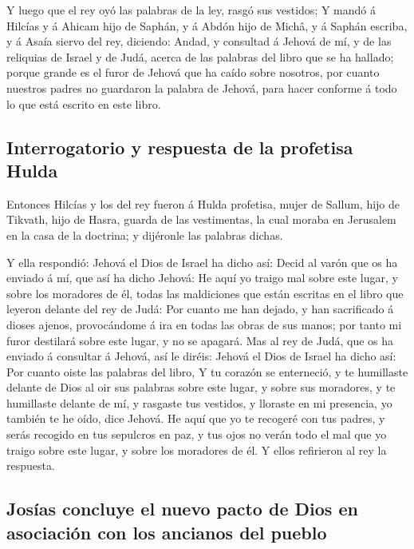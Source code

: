  Y luego que el rey oyó las palabras de la ley, rasgó sus
vestidos;  Y mandó á Hilcías y á Ahicam hijo de Saphán, y á
Abdón hijo de Michâ, y á Saphán escriba, y á Asaía siervo del rey,
diciendo:  Andad, y consultad á Jehová de mí, y de las
reliquias de Israel y de Judá, acerca de las palabras del libro que se
ha hallado; porque grande es el furor de Jehová que ha caído sobre
nosotros, por cuanto nuestros padres no guardaron la palabra de Jehová,
para hacer conforme á todo lo que está escrito en este libro.

\hypertarget{interrogatorio-y-respuesta-de-la-profetisa-hulda}{%
\subsection{Interrogatorio y respuesta de la profetisa
Hulda}\label{interrogatorio-y-respuesta-de-la-profetisa-hulda}}

 Entonces Hilcías y los del rey fueron á Hulda profetisa,
mujer de Sallum, hijo de Tikvath, hijo de Hasra, guarda de las
vestimentas, la cual moraba en Jerusalem en la casa de la doctrina; y
dijéronle las palabras dichas.

 Y ella respondió: Jehová el Dios de Israel ha dicho así:
Decid al varón que os ha enviado á mí, que así ha dicho Jehová:
 He aquí yo traigo mal sobre este lugar, y sobre los
moradores de él, todas las maldiciones que están escritas en el libro
que leyeron delante del rey de Judá:  Por cuanto me han
dejado, y han sacrificado á dioses ajenos, provocándome á ira en todas
las obras de sus manos; por tanto mi furor destilará sobre este lugar, y
no se apagará.  Mas al rey de Judá, que os ha enviado á
consultar á Jehová, así le diréis: Jehová el Dios de Israel ha dicho
así: Por cuanto oiste las palabras del libro,  Y tu corazón
se enterneció, y te humillaste delante de Dios al oir sus palabras sobre
este lugar, y sobre sus moradores, y te humillaste delante de mí, y
rasgaste tus vestidos, y lloraste en mi presencia, yo también te he
oído, dice Jehová.  He aquí que yo te recogeré con tus
padres, y serás recogido en tus sepulcros en paz, y tus ojos no verán
todo el mal que yo traigo sobre este lugar, y sobre los moradores de él.
Y ellos refirieron al rey la respuesta.

\hypertarget{josuxedas-concluye-el-nuevo-pacto-de-dios-en-asociaciuxf3n-con-los-ancianos-del-pueblo}{%
\subsection{Josías concluye el nuevo pacto de Dios en asociación con los
ancianos del
pueblo}\label{josuxedas-concluye-el-nuevo-pacto-de-dios-en-asociaciuxf3n-con-los-ancianos-del-pueblo}}


